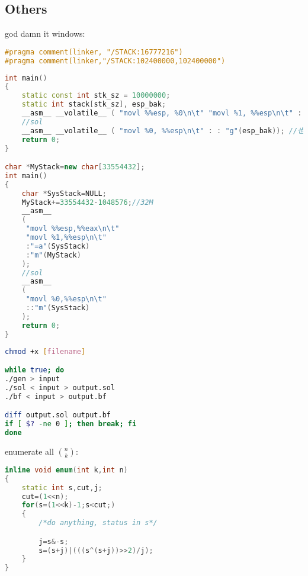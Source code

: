 \subsection{Others}
god damn it windows:\\
\begin{lstlisting}[language=C++]
#pragma comment(linker, "/STACK:16777216")
#pragma comment(linker,"/STACK:102400000,102400000")
\end{lstlisting}

\begin{lstlisting}[language=C++]
int main()
{
    static const int stk_sz = 10000000;
    static int stack[stk_sz], esp_bak;
    __asm__ __volatile__ ( "movl %%esp, %0\n\t" "movl %1, %%esp\n\t" : "=g"(esp_bak) : "g"(stack + stk_sz - 1));
    //sol
    __asm__ __volatile__ ( "movl %0, %%esp\n\t" : : "g"(esp_bak)); //也可以不恢复esp，直接exit(0);
    return 0;
}

char *MyStack=new char[33554432];
int main()
{
    char *SysStack=NULL;
    MyStack+=33554432-1048576;//32M
    __asm__
    (
     "movl %%esp,%%eax\n\t"
     "movl %1,%%esp\n\t"
     :"=a"(SysStack)
     :"m"(MyStack)
    );
    //sol
    __asm__
    (
     "movl %0,%%esp\n\t"
     ::"m"(SysStack)
    );
    return 0;
}
\end{lstlisting}

\begin{lstlisting}[language=sh]
chmod +x [filename]

while true; do
./gen > input
./sol < input > output.sol
./bf < input > output.bf

diff output.sol output.bf
if [ $? -ne 0 ]; then break; fi
done
\end{lstlisting}

enumerate all $\binom{n}{k}$:\\
\begin{lstlisting}[language=C++]
inline void enum(int k,int n)
{
    static int s,cut,j;
    cut=(1<<n);
    for(s=(1<<k)-1;s<cut;)
    {
        /*do anything, status in s*/

        j=s&-s;
        s=(s+j)|(((s^(s+j))>>2)/j);
    }
}
\end{lstlisting}

